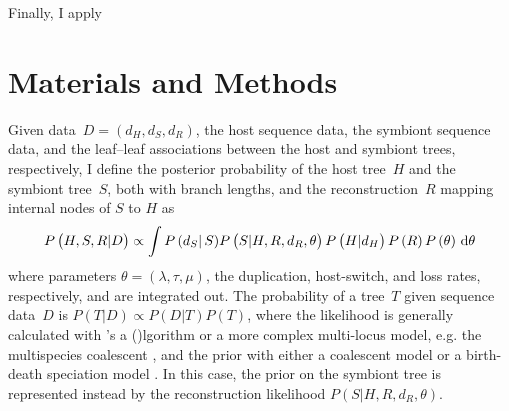 \documentclass[12pt,letterpaper]{article}
\newcommand{\citeapos}[2]{\citeauthor{#1}'s #2 (\citeyear{#1})}
\begin{document}
Finally, I apply 

\section*{Materials and Methods}


%
%
%

Given data~$D = \left(d_H,d_S,d_R\right)$, the host sequence data, the symbiont sequence data, and the leaf--leaf associations between the host and symbiont trees, respectively, I define the posterior probability of the host tree~$H$ and the symbiont tree~$S$, both with branch lengths, and the reconstruction~$R$ mapping internal nodes of $S$ to $H$ as
\begin{equation}
P\left(H,S,R|D\right) \propto \int P\left(d_S\right|S) P\left(S|H,R,d_R,\theta\right) P\left(H|d_H\right) P\left(R\right) P\left(\theta\right) \, \dif \theta
\label{eq:cophylogenyposterior}
\end{equation}
where parameters $\theta = \left(\lambda,\tau,\mu\right)$, the duplication, host-switch, and loss rates, respectively, and are integrated out. The probability of a tree~$T$ given sequence data~$D$ is $P\left(T|D\right) \propto P\left(D|T\right) P\left(T\right)$, where the likelihood is generally calculated with \citeapos{Felsenstein:1981} algorithm or a more complex multi-locus model, e.g. the multispecies coalescent \parencite{Heled:2010a}, and the prior with either a coalescent model \parencite{Kingman:1982} or a birth-death speciation model \parencite{Gernhard:2008}. In this case, the prior on the symbiont tree is represented instead by the reconstruction likelihood $P\left(S|H,R,d_R,\theta\right)$.
\end{document}
